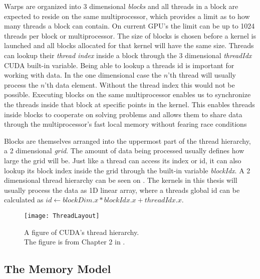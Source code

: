

Warps are organized into 3 dimensional \textit{blocks} and all threads in a
block are expected to reside on the same multiprocessor, which provides a limit
as to how many threads a block can contain. On current GPU's the limit can be up
to 1024 threads per block or multiprocessor. The size of blocks is chosen before
a kernel is launched and all blocks allocated for that kernel will have the same
size. Threads can lookup their \textit{thread index} inside a block through the
3 dimensional \textit{threadIdx} CUDA built-in variable. Being able to lookup a
threads id is important for working with data. In the one dimensional case the
$n$'th thread will usually process the $n$'th data element. Without the thread
index this would not be possible. Executing blocks on the same multiprocessor
enables us to synchronize the threads inside that block at specific points in
the kernel. This enables threads inside blocks to cooperate on solving problems
and allows them to share data through the multiprocessor's fast local memory
without fearing race conditions


Blocks are themselves arranged into the uppermost part of the thread hierarchy,
a 2 dimensional \textit{grid}. The amount of data being processed usually
defines how large the grid will be. Just like a thread can access its index or
id, it can also lookup its block index inside the grid through the built-in
variable \textit{blockIdx}. A 2 dimensional thread hierarchy can be seen on
. The kernels in this thesis will usually process the
data as 1D linear array, where a threads global id can be calculated as $id
\leftarrow blockDim.x * blockIdx.x + threadIdx.x$.

\begin{figure}
  \centering
  \texttt{[image: ThreadLayout]}
  \caption[CUDA's thread hierarchy.]{A figure of CUDA's thread
    hierarchy.\\ The figure is from Chapter 2 in .}
  \label{fig:threadLayout}
\end{figure}




\subsection{The Memory Model}\label{sec:memoryModel}

